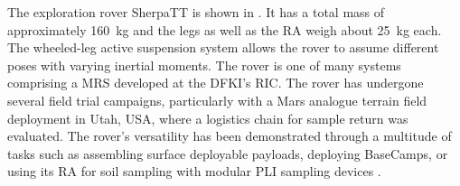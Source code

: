 The exploration rover SherpaTT is shown in . It has a total mass of approximately \SI{160}{\kilo\gram} and the legs as well as the \ac{RA} weigh about \SI{25}{\kilo\gram} each. The wheeled-leg active suspension system allows the rover to assume different poses with varying inertial moments. The rover is one of many systems comprising a \ac{MRS} developed at the \ac{DFKI}'s \ac{RIC}. The rover has undergone several field trial campaigns, particularly with a Mars analogue terrain field deployment in Utah, USA, where a logistics chain for sample return was evaluated. The rover's versatility has been demonstrated through a multitude of tasks such as assembling surface deployable payloads, deploying BaseCamps, or using its \ac{RA} for soil sampling with modular \ac{PLI} sampling devices .

\vspace{0.4cm}

